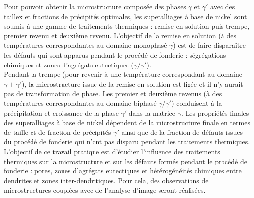 Pour pouvoir obtenir la microstructure composée des phases $\gamma$ et $\gamma'$
avec des taillex et fractions de précipités optimales, les superalliages à base de
nickel sont soumis à une gamme de traitements thermiques : remise en solution puis
trempe, premier revenu et deuxième revenu. L’objectif de la remise en solution
(à des températures correspondantes au domaine monophasé $\gamma$) est de faire
disparaître les défauts qui sont apparus pendant le procédé de fonderie : 
ségrégations chimiques et zones d’agrégats eutectiques ($\gamma / \gamma'$).\\

Pendant la trempe (pour revenir à une température correspondant au domaine
$\gamma + \gamma'$), la microstructure issue de la remise en solution est figée 
et il n’y aurait pas de transformation de phase. Les premier et deuxième revenus 
(à des températures correspondantes au domaine biphasé $\gamma / \gamma'$) conduisent
à la précipitation et croissance de la phase $\gamma'$ dans la matrice $\gamma$. 
Les propriétés finales des superalliages à base de nickel dépendent de la microstructure 
finale en termes de taille et de fraction de précipités $\gamma'$ ainsi que de la 
fraction de défauts issues du procédé de fonderie qui n’ont pas disparu pendant 
les traitements thermiques.\\


L’objectif de ce travail pratique est d’étudier l’influence des traitements thermiques 
sur la microstructure et sur les défauts formés pendant le procédé de fonderie : pores, 
zones d’agrégats eutectiques et hétérogénéités chimiques entre dendrites et zones 
inter-dendritiques. Pour cela, des observations de microstructures couplées avec de 
l’analyse d’image seront réalisées.

